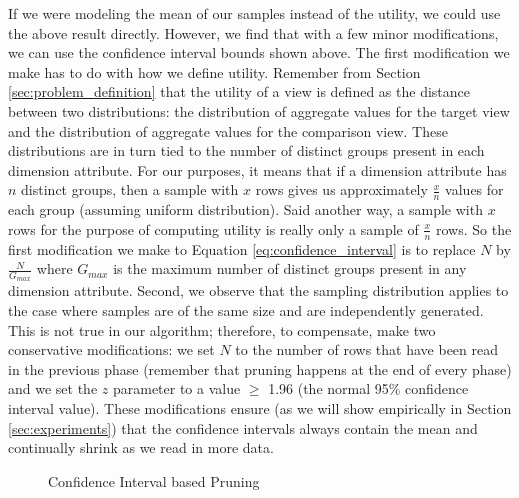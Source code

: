 If we were modeling the mean of our samples instead of the utility, we could use
the above result directly.
However, we find that with a few minor modifications, we can use the confidence
interval bounds shown above.
The first modification we make has to do with how we define utility.
Remember from Section \ref{sec:problem_definition} that the utility of a view is
defined as the distance between two distributions: the distribution of aggregate values for the
target view and the distribution of aggregate values for the comparison view.
These distributions are in turn tied to the number of distinct groups present in
each dimension attribute.
For our purposes, it means that if a dimension attribute has $n$ distinct
groups, then a sample with $x$ rows gives us approximately $\frac{x}{n}$ values
for each group (assuming uniform distribution).
Said another way, a sample with $x$ rows for the purpose of computing utility is
really only a sample of $\frac{x}{n}$ rows.
So the first modification we make to Equation \ref{eq:confidence_interval} is to
replace $N$ by $\frac{N}{G_{max}}$ where $G_{max}$ is the maximum number of
distinct groups present in any dimension attribute.
Second, we observe that the sampling distribution applies to the case where
samples are of the same size and are independently generated.
This is not true in our algorithm; therefore, to compensate, make two
conservative modifications: we set $N$ to the number of rows that
have been read in the previous phase (remember that pruning happens at the end
of every phase) and we set the $z$ parameter to a value $\geq$ 1.96 (the normal
95\% confidence interval value). These modifications ensure (as we will show
empirically in Section \ref{sec:experiments}) that the confidence intervals
always contain the mean and continually shrink as we read in more data.


\begin{figure}[htb]
\vspace{-10pt}
\centerline{
\hbox{}}
\caption{Confidence Interval based Pruning}
\label{fig:conf_interval}
\vspace{-12pt}
\end{figure}

